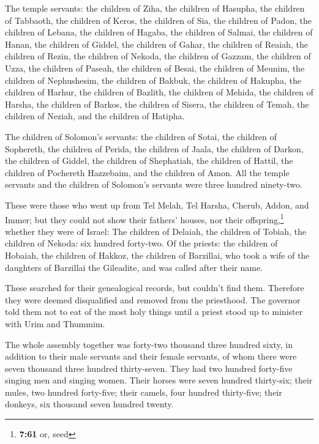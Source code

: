  The temple servants: the children of Ziha, the children
of Hasupha, the children of Tabbaoth,  the children of
Keros, the children of Sia, the children of Padon,  the
children of Lebana, the children of Hagaba, the children of Salmai,
 the children of Hanan, the children of Giddel, the
children of Gahar,  the children of Reaiah, the children
of Rezin, the children of Nekoda,  the children of
Gazzam, the children of Uzza, the children of Paseah, 
the children of Besai, the children of Meunim, the children of
Nephushesim,  the children of Bakbuk, the children of
Hakupha, the children of Harhur,  the children of
Bazlith, the children of Mehida, the children of Harsha, 
the children of Barkos, the children of Sisera, the children of Temah,
 the children of Neziah, and the children of Hatipha.

 The children of Solomon's servants: the children of
Sotai, the children of Sophereth, the children of Perida,
 the children of Jaala, the children of Darkon, the
children of Giddel,  the children of Shephatiah, the
children of Hattil, the children of Pochereth Hazzebaim, and the
children of Amon.  All the temple servants and the
children of Solomon's servants were three hundred ninety-two.

 These were those who went up from Tel Melah, Tel Harsha,
Cherub, Addon, and Immer; but they could not show their fathers' houses,
nor their offspring,\footnote{\textbf{7:61} or, seed} whether they were
of Israel:  The children of Delaiah, the children of
Tobiah, the children of Nekoda: six hundred forty-two. 
Of the priests: the children of Hobaiah, the children of Hakkoz, the
children of Barzillai, who took a wife of the daughters of Barzillai the
Gileadite, and was called after their name.

 These searched for their genealogical records, but
couldn't find them. Therefore they were deemed disqualified and removed
from the priesthood.  The governor told them not to eat
of the most holy things until a priest stood up to minister with Urim
and Thummim.

 The whole assembly together was forty-two thousand three
hundred sixty,  in addition to their male servants and
their female servants, of whom there were seven thousand three hundred
thirty-seven. They had two hundred forty-five singing men and singing
women.  Their horses were seven hundred thirty-six; their
mules, two hundred forty-five;  their camels, four
hundred thirty-five; their donkeys, six thousand seven hundred twenty.

